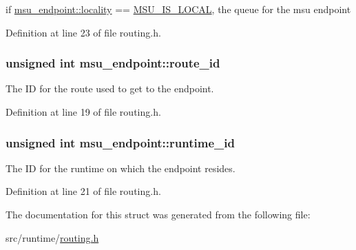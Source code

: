 if \hyperlink{structmsu__endpoint_aa06a2a0cc4c7ba40109635371acc8249}{msu\-\_\-endpoint\-::locality} == \hyperlink{dfg_8h_a97b014aefcfb738ba60c39a3bbd44c31a28350aae24171519a7e1f4811f157298}{M\-S\-U\-\_\-\-I\-S\-\_\-\-L\-O\-C\-A\-L}, the queue for the msu endpoint 



Definition at line 23 of file routing.\-h.

\hypertarget{structmsu__endpoint_a8ffa7bacf8556511dc2d4129107d4868}{
\subsubsection[{route\-\_\-id}]{\setlength{\rightskip}{0pt plus 5cm}unsigned int msu\-\_\-endpoint\-::route\-\_\-id}}\label{structmsu__endpoint_a8ffa7bacf8556511dc2d4129107d4868}


The I\-D for the route used to get to the endpoint. 



Definition at line 19 of file routing.\-h.

\hypertarget{structmsu__endpoint_aa0f75c3179e67f5f6b0edc166ebd3119}{
\subsubsection[{runtime\-\_\-id}]{\setlength{\rightskip}{0pt plus 5cm}unsigned int msu\-\_\-endpoint\-::runtime\-\_\-id}}\label{structmsu__endpoint_aa0f75c3179e67f5f6b0edc166ebd3119}


The I\-D for the runtime on which the endpoint resides. 



Definition at line 21 of file routing.\-h.



The documentation for this struct was generated from the following file\-:\begin{DoxyCompactItemize}
\item 
src/runtime/\hyperlink{routing_8h}{routing.\-h}\end{DoxyCompactItemize}
